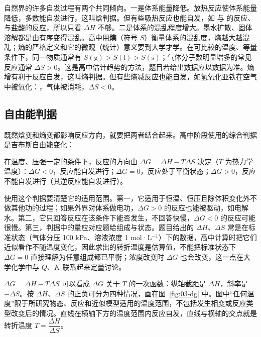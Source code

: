 自然界的许多自发过程有两个共同倾向。一是体系能量降低。放热反应使体系能量降低，多数能自发进行，这叫焓判据。但有些吸热反应也能自发，如  与  的反应、 与盐酸的反应，所以只看 $\Delta H$ 不够。二是体系的混乱程度增大。墨水扩散、固体溶解都是由有序变得混乱。高中用\textbf{熵}（符号 $S$）衡量体系的混乱度，熵越大越混乱；熵的严格定义和它的微观（统计）意义要到大学才学。在可比较的温度、等量条件下，同一物质通常有 $S(\mathrm{g})>S(\mathrm{l})>S(\mathrm{s})$；气体分子数明显增多的常见反应通常 $\Delta S>0$。这是高中估计趋势的方法，题目若给出数据应以数据为准。熵增有利于反应自发，这叫熵判据。但有些熵减反应也能自发，如氢氧化亚铁在空气中被氧化：，气体被消耗，$\Delta S<0$。

\subsection{自由能判据}
既然焓变和熵变都影响反应方向，就要把两者结合起来。高中阶段使用的综合判据是吉布斯自由能变化：

\begin{gainian}[自由能判据]
在温度、压强一定的条件下，反应的方向由 $\Delta G=\Delta H-T\Delta S$ 决定（$T$ 为热力学温度）：$\Delta G<0$，反应能自发进行；$\Delta G=0$，反应处于平衡状态；$\Delta G>0$，反应不能自发进行（其逆反应能自发进行）。
\end{gainian}

使用这个判据要清楚它的适用范围。第一，它适用于恒温、恒压且除体积变化外不做其他功的过程；如果外界对体系做电功，$\Delta G>0$ 的反应也能被驱动，如电解水。第二，它只回答反应在该条件下能否发生，不回答快慢，$\Delta G<0$ 的反应可能很慢。第三，判据中的量应对应题给组成与状态。题目给出的 $\Delta H$、$\Delta S$ 常是在标准状态（气体分压 100 kPa、溶液浓度 1 mol·L$^{-1}$）下的数据，高中计算时把它们近似看作不随温度变化，因此求出的转折温度是估算值，不能把标准状态下 $\Delta G=0$ 直接理解为任意组成都已平衡；浓度改变时 $\Delta G$ 也会改变，这一点在大学化学中与 $Q$、$K$ 联系起来定量讨论。

$\Delta G=\Delta H-T\Delta S$ 可以看成 $\Delta G$ 关于 $T$ 的一次函数：纵轴截距是 $\Delta H$，斜率是 $-\Delta S$。按 $\Delta H$、$\Delta S$ 的正负可分为四种情况，画在图~\ref{fig:03-dg} 中。图中“任何温度”限于所研究物态、反应和近似模型适用的温度范围，不包括发生相变或反应类型改变后的情况。直线在横轴下方的温度范围内反应自发，直线与横轴的交点就是转折温度 $T=\dfrac{\Delta H}{\Delta S}$。

